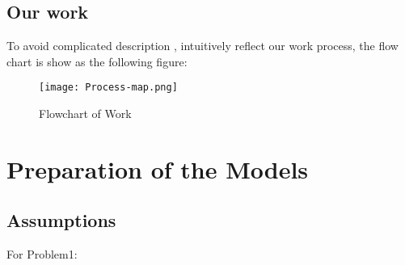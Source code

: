 \documentclass[12pt]{article}  %
\begin{document}
\subsection{Our work}
To avoid complicated description , intuitively reflect our work process, the flow chart is show
as the following figure:
\begin{figure}[H]
	\centering
	\texttt{[image: Process-map.png]}
	\caption{Flowchart of Work}\label{fig:Process-map}
\end{figure}

\section{Preparation of the Models}
\subsection{Assumptions}
For Problem1:
\end{document}
